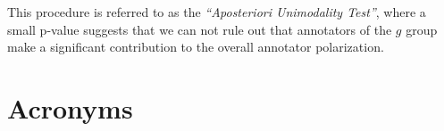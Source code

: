\documentclass{article}
\begin{document}
This procedure is referred to as the \textit{``Aposteriori Unimodality Test''}, where a small p-value suggests that we can not rule out that annotators of the $g$ group make a significant contribution to the overall annotator polarization.


\section{Acronyms}

\begin{acronym}[WWW]
\end{acronym}

\printbibliography
\end{document}
